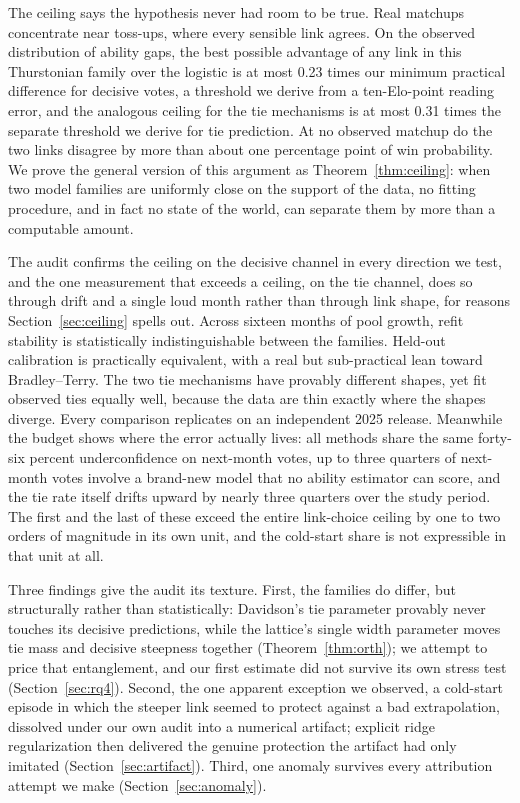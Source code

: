 \documentclass[10pt]{article}
\begin{document}
The ceiling says the hypothesis never had room to be true. Real
matchups concentrate near toss-ups, where every sensible link agrees.
On the observed distribution of ability gaps, the best possible
advantage of any link in this Thurstonian family over the logistic is
at most 0.23 times our minimum practical difference for decisive
votes, a threshold we derive from a ten-Elo-point reading error, and
the analogous ceiling for the tie mechanisms is at most 0.31 times
the separate threshold we derive for tie prediction. At no observed
matchup do the two links disagree by more than about one percentage
point of win probability. We prove the general version of this
argument as Theorem~\ref{thm:ceiling}: when two model families are
uniformly close on the support of the data, no fitting procedure, and
in fact no state of the world, can separate them by more than a
computable amount.

The audit confirms the ceiling on the decisive channel in every
direction we test, and the one measurement that exceeds a ceiling,
on the tie channel, does so through drift and a single loud month
rather than through link shape, for reasons
Section~\ref{sec:ceiling} spells out. Across
sixteen months of pool growth, refit stability is statistically
indistinguishable between the families. Held-out calibration is
practically equivalent, with a real but sub-practical lean toward
Bradley--Terry. The two tie mechanisms have provably different shapes,
yet fit observed ties equally well, because the data are thin exactly
where the shapes diverge. Every comparison replicates on an
independent 2025 release. Meanwhile the budget shows where the error
actually lives: all methods share the same forty-six percent
underconfidence on next-month votes, up to three quarters of
next-month votes involve a brand-new model that no ability estimator
can score, and the tie rate itself drifts upward by nearly three
quarters over the study period. The first and the last of these
exceed the entire link-choice ceiling by one to two orders of
magnitude in its own unit, and the cold-start share is not
expressible in that unit at all.

Three findings give the audit its texture. First, the families do
differ, but structurally rather than statistically: Davidson's tie
parameter provably never touches its decisive predictions, while the
lattice's single width parameter moves tie mass and decisive
steepness together (Theorem~\ref{thm:orth}); we attempt to price that
entanglement, and our first estimate did not survive its own stress
test (Section~\ref{sec:rq4}). Second, the one
apparent exception we observed, a cold-start episode in which the
steeper link seemed to protect against a bad extrapolation, dissolved
under our own audit into a numerical artifact; explicit ridge
regularization then delivered the genuine protection the artifact had
only imitated (Section~\ref{sec:artifact}). Third, one anomaly
survives every attribution attempt we make
(Section~\ref{sec:anomaly}).
\end{document}
